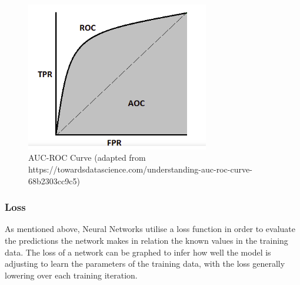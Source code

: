 \documentclass[12pt]{report}
\begin{document}
\vspace{0.5cm}
\begin{figure}[ht!]
	\centering
	\includegraphics[width=8cm]{aucroc}
	\caption{AUC-ROC Curve (adapted from https://towardsdatascience.com/understanding-auc-roc-curve-68b2303cc9c5)}
	\label{fig:aucroc}
\end{figure}

\newpage
\subsubsection*{Loss}
\begin{flushleft}
As mentioned above, Neural Networks utilise a loss function in order to evaluate the predictions the network makes in relation the known values in the training data. The loss of a network can be graphed to infer how well the model is adjusting to learn the parameters of the training data, with the loss generally lowering over each training iteration.
\end{flushleft}
\end{document}

